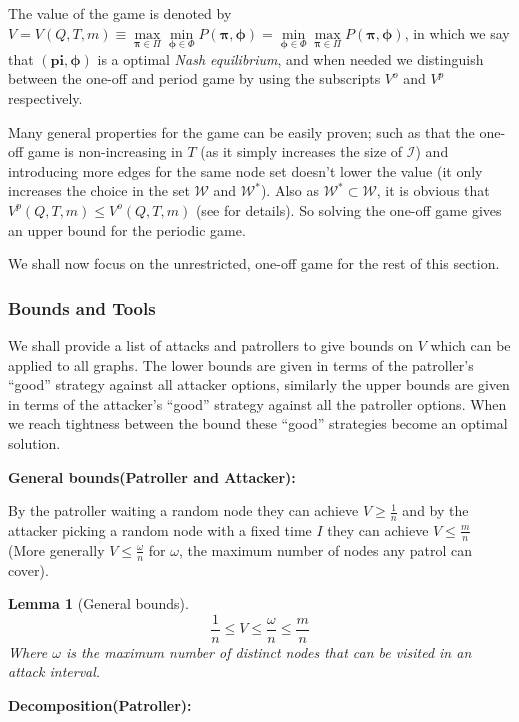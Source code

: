 \documentclass[a4paper,10pt]{article}
\newtheorem{lemma}[theorem]{Lemma}
\theoremstyle{definition}
\theoremstyle{definition}
\theoremstyle{remark}
\theoremstyle{definition}
\begin{document}
The value of the game is denoted by $V=V(Q,T,m) \equiv \max\limits_{\bm{\pi} \in \Pi} \min\limits_{\bm{\phi} \in \Phi} P(\bm{\pi},\bm{\phi})=\min\limits_{\bm{\phi} \in \Phi} \max\limits_{\bm{\pi} \in \Pi} P(\bm{\pi},\bm{\phi})$, in which we say that $(\bm{pi},\bm{\phi})$ is a optimal \textit{Nash equilibrium}, and when needed we distinguish between the one-off and period game by using the subscripts $V^{o}$ and $V^p$ respectively.

Many general properties for the game can be easily proven; such as that the one-off game is non-increasing in $T$ (as it simply increases the size of $\mathcal{I}$) and introducing more edges for the same node set doesn't lower the value (it only increases the choice in the set $\mathcal{W}$ and $\mathcal{W}^*$). Also as $\mathcal{W}^* \subset \mathcal{W}$, it is obvious that $V^{p} (Q,T,m) \leq V^{o} (Q,T,m)$ (see \cite{Alpern2011} for details). So solving the one-off game gives an upper bound for the periodic game.

We shall now focus on the unrestricted, one-off game for the rest of this section.

\subsubsection{Bounds and Tools}
We shall provide a list of attacks and patrollers to give bounds on $V$ which can be applied to all graphs. The lower bounds are given in terms of the patroller's ``good'' strategy against all attacker options, similarly the upper bounds are given in terms of the attacker's ``good'' strategy against all the patroller options. When we reach tightness between the bound these ``good'' strategies become an optimal solution.

\textbf{General bounds(Patroller and Attacker):}

By the patroller waiting a random node they can achieve $V \geq \frac{1}{n}$ and by the attacker picking a random node with a fixed time $I$ they can achieve $V \leq \frac{m}{n}$ (More generally $V \leq \frac{\omega}{n}$ for $\omega$, the maximum number of nodes any patrol can cover).

\begin{lemma}[General bounds]
\label{Lemma:General bounds}
$$\frac{1}{n} \leq V \leq \frac{\omega}{n} \leq \frac{m}{n}$$
Where $\omega$ is the maximum number of distinct nodes that can be visited in an attack interval.
\end{lemma}

\textbf{Decomposition(Patroller):}
\end{document}
